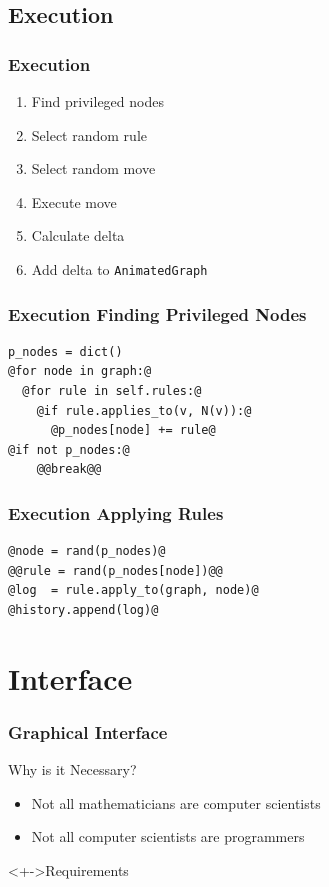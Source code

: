 \documentclass{beamer}
\begin{document}
\subsection{Execution}
\begin{frame}
  \frametitle{Execution}
  \begin{enumerate}[<+->]
  \item Find privileged nodes
  \item Select random rule
  \item Select random move
  \item Execute move
  \item Calculate delta
  \item Add delta to \texttt{AnimatedGraph}
  \end{enumerate}
\end{frame}
\begin{frame}[fragile]
  \frametitle{Execution \Dash Finding Privileged Nodes}
\begin{lstlisting}[style=pystep]
p_nodes = dict()
@for node in graph:@
  @for rule in self.rules:@
    @if rule.applies_to(v, N(v)):@
      @p_nodes[node] += rule@
@if not p_nodes:@
    @@break@@
\end{lstlisting}
\end{frame}
\begin{frame}[fragile]
  \frametitle{Execution \Dash Applying Rules}
\begin{lstlisting}[style=pystep]
@node = rand(p_nodes)@
@@rule = rand(p_nodes[node])@@
@log  = rule.apply_to(graph, node)@
@history.append(log)@
\end{lstlisting}
\end{frame}

\section{Interface}
\ifTOC\frame{\tableofcontents[currentsection]}\fi
\begin{frame}
  \frametitle{Graphical Interface}
  \begin{block}{Why is it Necessary?}
    \begin{itemize}[<+->]
    \item Not all mathematicians are computer scientists
    \item Not all computer scientists are programmers
    \end{itemize}
  \end{block}
  \begin{block}<+->{Requirements}
  \end{block}
\end{frame}
\end{document}
